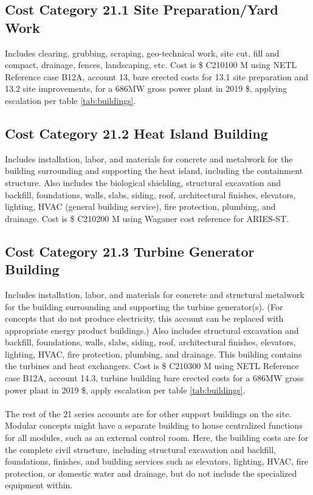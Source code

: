 










\subsection*{Cost Category 21.1 Site Preparation/Yard Work}
Includes clearing, grubbing, scraping, geo-technical work, site cut, fill and compact, drainage, fences, landscaping, etc.  Cost is \$ C210100 M using NETL Reference case B12A, account 13, bare erected costs for 13.1 site preparation and 13.2 site improvements, for a 686MW gross power plant in 2019 \$, applying escalation per table \ref{tab:buildings}.

\subsection*{Cost Category 21.2 Heat Island Building}
Includes installation, labor, and materials for concrete and metalwork for the building surrounding and supporting the heat island, including the containment structure. Also includes the biological shielding, structural excavation and backfill, foundations, walls, slabs, siding, roof, architectural finishes, elevators, lighting, HVAC (general building service), fire protection, plumbing, and drainage. Cost is \$ C210200 M using Waganer cost reference for ARIES-ST.


\subsection*{Cost Category 21.3 Turbine Generator Building}
Includes installation, labor, and materials for concrete and structural metalwork for the building surrounding and supporting the turbine generator(s). (For concepts that do not produce electricity, this account can be replaced with appropriate energy product buildings.) Also includes structural excavation and backfill, foundations, walls, slabs, siding, roof, architectural finishes, elevators, lighting, HVAC, fire protection, plumbing, and drainage.  This building contains the turbines and heat exchangers. Cost is \$ C210300 M using NETL Reference case B12A, account 14.3, turbine building bare erected costs for a 686MW gross power plant in 2019 \$, apply escalation per table \ref{tab:buildings}.

\paragraph{}
The rest of the 21 series accounts are for other support buildings on the site. Modular concepts might have a separate building to house centralized functions for all modules, such as an external control room. Here, the building costs are for the complete civil structure, including structural excavation and backfill, foundations, finishes, and building services such as elevators, lighting, HVAC, fire protection, or domestic water and drainage, but do not include the specialized equipment within.\\

